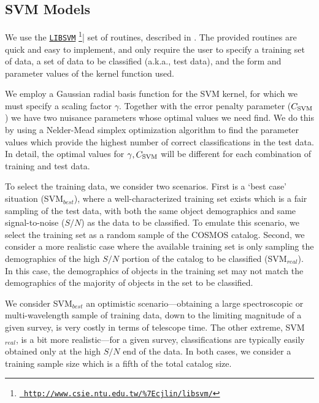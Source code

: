 \documentclass[12pt,preprint]{aastex}
\begin{document}
\subsection{SVM Models}

We use the
\href{http://www.csie.ntu.edu.tw/\%7Ecjlin/libsvm/}{\texttt{LIBSVM}}
\footnote{\href{http://www.csie.ntu.edu.tw/\%7Ecjlin/libsvm/} {\tt
    http://www.csie.ntu.edu.tw/\%7Ecjlin/libsvm/}}| set of routines,
described in \citet{chang11a}.  The provided routines are quick and
easy to implement, and only require the user to specify a training set
of data, a set of data to be classified (a.k.a., test data), and the form 
and parameter values of the kernel function used.  

We employ a Gaussian radial basis function for the SVM kernel, 
for which we must specify a scaling factor $\gamma$.  Together with 
the error penalty parameter ($C_{\rm SVM}$) we have two 
nuisance parameters whose optimal values we need 
find.  We do this by using a Nelder-Mead simplex optimization algorithm to find the 
parameter values which provide the highest number of correct 
classifications in the test data.  In detail, the optimal values for 
$\gamma,C_{\rm SVM}$ will be different for each combination of 
training and test data.

To select the training data, we consider two scenarios.  First is a
`best case' situation (SVM$_{best}$), where a well-characterized
training set exists which is a fair sampling of the test data, with both 
the same object demographics and same signal-to-noise ($S/N$) as the data to be 
classified.  To emulate this scenario, we select
the training set as a random sample of the COSMOS catalog.  Second, we
consider a more realistic case where the available training set is
only sampling the demographics of the high $S/N$
portion of the catalog to be classified (SVM$_{real}$).  In this
case, the demographics of objects in the training set may not match
the demographics of the majority of objects in the set to be
classified.

We consider SVM$_{best}$ an optimistic scenario---obtaining a large
spectroscopic or multi-wavelength sample of training data, down to the
limiting magnitude of a given survey, is very costly in terms of
telescope time.  The other extreme, SVM$_{real}$, is a bit more
realistic---for a given survey, classifications are typically easily
obtained only at the high $S/N$ end of the data.  In both cases, we
consider a training sample size which is a fifth of the total catalog
size.
\end{document}
